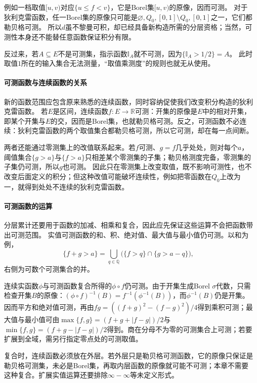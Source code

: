 例如一档取值$[u,v)$对应$\{u\leq f<v\}$，它是Borel集$[u,v)$的原像，因而可测。
对于狄利克雷函数，任一Borel集的原像只可能是$\varnothing,Q_0,[0,1]\setminus Q_0,[0,1]$之一，它们都勒贝格可测。
所以$d$虽不黎曼可积，却已经具备新构造所需的分层资格；当然，可测性本身还不能替任意函数保证积分有限。

反过来，若$A\subseteq E$不是可测集，指示函数$\mathbb I_A$就不可测，因为$\{\mathbb I_A>1/2\}=A$。
此时取值$1$所在的输入集合无法测量，“取值乘测度”的规则也就无从使用。

\paragraph{可测函数与连续函数的关系}
新的函数范围应包含原来熟悉的连续函数，同时容纳促使我们改变积分构造的狄利克雷函数。
若$E$是区间，连续函数$f:E\to\mathbb R$可测：开集的原像是$E$中的相对开集，即某个开集与$E$的交，因而是Borel集，也就勒贝格可测。反之，可测函数不必连续：狄利克雷函数的两个取值集合都勒贝格可测，所以它可测，却在每一点间断。

两者还能通过零测集上的改值联系起来。若$f$可测、$g=f$几乎处处，则对每个$a$，阈值集合$\{g>a\}$与$\{f>a\}$只相差某个零测集的子集；勒贝格测度完备，零测集的子集仍可测，所以$g$也可测。
因此只在零测集上改变取值，既不影响可测性，也不改变后面定义的积分；但这种改值可能破坏连续性，例如把零函数在$Q_0$上改为一，就得到处处不连续的狄利克雷函数。

\paragraph{可测函数的运算}
分层累计还要用于函数的加减、相乘和复合，因此应先保证这些运算不会把函数带出可测范围。
实值可测函数的和、积、绝对值、最大值与最小值仍可测。以和为例，
\[
 \{f+g>a\}=\bigcup_{q\in\mathbb Q}\bigl(\{f>q\}\cap\{g>a-q\}\bigr),
\]
右侧为可数个可测集合的并。

连续实函数$\phi$与可测函数复合所得的$\phi\circ f$仍可测。由于开集生成Borel $\sigma$代数，只需检查开集$B$的原像：$(\phi\circ f)^{-1}(B)=f^{-1}(\phi^{-1}(B))$，而$\phi^{-1}(B)$仍是开集。因而平方和绝对值可测，再由$fg=((f+g)^2-(f-g)^2)/4$得到乘积可测；最大值与最小值可由$\max\{f,g\}=(f+g+|f-g|)/2$与$\min\{f,g\}=(f+g-|f-g|)/2$得到。商在分母不为零的可测集合上可测；若要扩展到全域，需另行指定零点处的可测取值。

复合时，连续函数必须放在外层。若外层只是勒贝格可测函数，它的原像只保证是勒贝格可测集，未必是Borel集，再取内层函数的原像就可能不可测；本章不需要这种复合。扩展实值运算还要排除$\infty-\infty$等未定义形式。


